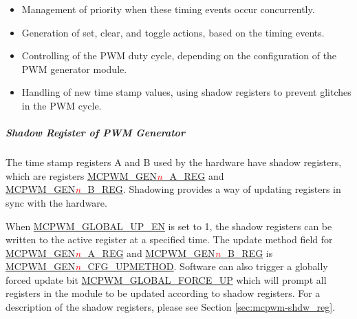 \documentclass[main\_\_EN.tex]{subfiles}
\begin{document}
\begin{itemize}
\begin{itemize}
        \item DT0: the PWM timer is counting down and FAULT0 detected (field \hyperref[fielddesc:MCPWMGENNT0SEL]{MCPWM\_GEN\textcolor{red}{\it{n}}\_T0\_SEL} is set to 0) or FAULT1 detected (field \hyperref[fielddesc:MCPWMGENNT0SEL]{MCPWM\_GEN\textcolor{red}{\it{n}}\_T0\_SEL} is set to 1) or FAULT2 detected (field \hyperref[fielddesc:MCPWMGENNT0SEL]{MCPWM\_GEN\textcolor{red}{\it{n}}\_T0\_SEL} is set to 2) or synchronized (field \hyperref[fielddesc:MCPWMGENNT0SEL]{MCPWM\_GEN\textcolor{red}{\it{n}}\_T0\_SEL} is set to 3).
        \item DT1: the PWM timer is counting down and FAULT0 detected(field \hyperref[fielddesc:MCPWMGENNT0SEL]{MCPWM\_GEN\textcolor{red}{\it{n}}\_T1\_SEL} is set to 0) or FAULT1 detected (field \hyperref[fielddesc:MCPWMGENNT0SEL]{MCPWM\_GEN\textcolor{red}{\it{n}}\_T1\_SEL} is set to 1) or FAULT2 detected (field \hyperref[fielddesc:MCPWMGENNT0SEL]{MCPWM\_GEN\textcolor{red}{\it{n}}\_T1\_SEL} is set to 2) or synchronized (field \hyperref[fielddesc:MCPWMGENNT0SEL]{MCPWM\_GEN\textcolor{red}{\it{n}}\_T1\_SEL} is set to 3).
    \end{itemize}
    \item Management of priority when these timing events occur concurrently.
    \item Generation of set, clear, and toggle actions, based on the timing events.
    \item Controlling of the PWM duty cycle, depending on the configuration of the PWM generator module.
    \item Handling of new time stamp values, using shadow registers to prevent glitches in the PWM cycle.
\end{itemize}

\subparagraph{Shadow Register of PWM Generator}
\label{subpara:mcpwm-op-shadow}
The time stamp registers A and B used by the hardware have shadow registers, which are registers  \hyperref[regdesc:MCPWMGENNAREG]{MCPWM\_GEN\textcolor{red}{\it{n}}\_A\_REG} and\\ \hyperref[regdesc:MCPWMGENNBREG]{MCPWM\_GEN\textcolor{red}{\it{n}}\_B\_REG}. Shadowing provides a way of updating registers in sync with the hardware.

When \hyperref[fielddesc:MCPWMGLOBALUPEN]{MCPWM\_GLOBAL\_UP\_EN} is set to 1, the shadow registers can be written to the active register at a specified time. The update method field for \hyperref[regdesc:MCPWMGENNAREG]{MCPWM\_GEN\textcolor{red}{\it{n}}\_A\_REG} and \hyperref[regdesc:MCPWMGENNBREG]{MCPWM\_GEN\textcolor{red}{\it{n}}\_B\_REG} is \hyperref[fielddesc:MCPWMGENNCFGUPMETHOD]{MCPWM\_GEN\textcolor{red}{\it{n}}\_CFG\_UPMETHOD}. Software can also trigger a globally forced update bit \hyperref[fielddesc:MCPWMGLOBALFORCEUP]{MCPWM\_GLOBAL\_FORCE\_UP} which will prompt all registers in the module to be updated according to shadow registers. For a description of the shadow registers, please see Section \ref{sec:mcpwm-shdw_reg}.
\end{document}
